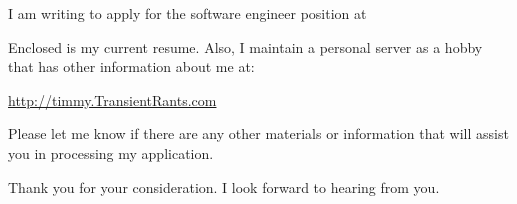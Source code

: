 \documentclass[10pt,stdletter,dateno]{newlfm}
\begin{document}
\begin{newlfm}

I am writing to apply for the software engineer position at 

Enclosed is my current resume.  Also, I maintain a personal server as a hobby that has 
other information about me at:

\url{http://timmy.TransientRants.com}

Please let me know if there are any other materials or information that will assist you in processing my application.

Thank you for your consideration.  I look forward to hearing from you.

\end{newlfm}
\end{document}
